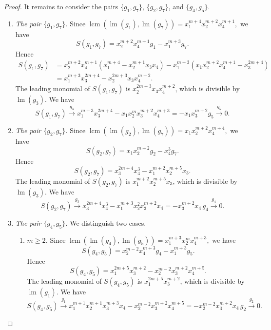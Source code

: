 \documentclass[12pt,a4paper]{amsart}
\theoremstyle{definition}
\begin{document}
\begin{proof}
It remains to consider the pairs
$\{g_1,g_7\}$,
$\{g_2,g_7\}$, and
$\{g_4,g_5\}$.

\begin{enumerate}
\item[\textup{(i)}] \emph{The pair $\{g_1,g_7\}$.} Since
$
\operatorname{lcm}\!\left(\operatorname{lm}(g_1),\operatorname{lm}(g_7)\right)
=
x_1^{m+4}x_2^{m+2}x_4^{m+1},$
we have
\[
S(g_1,g_7)
=
x_2^{m+2}x_4^{m+1}g_1
-
x_1^{m+3}g_7.
\]
Hence
\[
\begin{aligned}
S(g_1,g_7)
&=
x_2^{m+2}x_4^{m+1}
(x_1^{m+4}-x_2^{m+1}x_3x_4)
-
x_1^{m+3}
(x_1x_2^{m+2}x_4^{m+1}-x_3^{2m+4})\\
&=
x_1^{m+3}x_3^{2m+4}
-
x_2^{2m+3}x_3x_4^{m+2}.
\end{aligned}
\]
The leading monomial of $S(g_1,g_7)$ is
$x_2^{2m+3}x_3x_4^{m+2}$, which is divisible by
$\operatorname{lm}(g_3)$. We have
\[S(g_1,g_7)
\stackrel{g_3}{\longrightarrow}
x_1^{m+3}x_3^{2m+4}-x_1x_2^mx_3^{m+2}x_4^{m+3}=
-x_1x_3^{m+2}g_5
\stackrel{g_5}{\longrightarrow}
0.\]

\item[\textup{(ii)}] \emph{The pair $\{g_2,g_7\}$.} Since
$
\operatorname{lcm}\!\left(\operatorname{lm}(g_2),\operatorname{lm}(g_7)\right)
=
x_1x_2^{m+2}x_4^{m+4},$
we have
\[
S(g_2,g_7)
=
x_1x_2^{m+2}g_2
-
x_4^3g_7.
\]
Hence
\[
S(g_2,g_7)
=
x_3^{2m+4}x_4^3
-
x_1^{m+2}x_2^{m+5}x_3.
\]
The leading monomial of $S(g_2,g_7)$ is
$x_1^{m+2}x_2^{m+5}x_3$, which is divisible by
$\operatorname{lm}(g_3)$. We have
\[S(g_2,g_7)
\stackrel{g_3}{\longrightarrow}
x_3^{2m+4}x_4^3-x_1^{m+3}x_2^2x_3^{m+2}x_4=
-x_3^{m+2}x_4\,g_4
\stackrel{g_4}{\longrightarrow}
0.\]

\item[\textup{(iii)}] \emph{The pair $\{g_4,g_5\}$.} We distinguish two cases.

\begin{enumerate}
\item[\textup{(a)}] \emph{$m\ge2$.} Since
$
\operatorname{lcm}\!\left(\operatorname{lm}(g_4),\operatorname{lm}(g_5)\right)
=
x_1^{m+3}x_2^mx_4^{m+3},$
we have
\[
S(g_4,g_5)
=
x_2^{m-2}x_4^{m+3}g_4
-
x_1^{m+3}g_5.
\]
Hence
\[
S(g_4,g_5)
=
x_1^{2m+5}x_3^{m+2}
-
x_2^{m-2}x_3^{m+2}x_4^{m+5}.
\]
The leading monomial of $S(g_4,g_5)$ is
$x_1^{2m+5}x_3^{m+2}$, which is divisible by
$\operatorname{lm}(g_1)$. We have
$$S(g_4,g_5)
\stackrel{g_1}{\longrightarrow}
x_1^{m+1}x_2^{m+1}x_3^{m+3}x_4
-
x_2^{m-2}x_3^{m+2}x_4^{m+5}=
-x_2^{m-2}x_3^{m+2}x_4\,g_2
\stackrel{g_2}{\longrightarrow}
0.$$


\end{enumerate}
\end{enumerate}
\end{proof}
\end{document}
